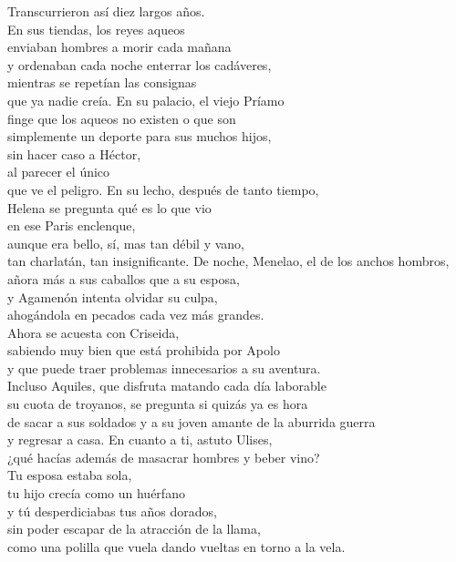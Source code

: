 \begin{versopropio}
Transcurrieron así diez largos años.\\
En sus tiendas, los reyes aqueos\\
enviaban hombres a morir cada mañana\\
y ordenaban cada noche enterrar los cadáveres,\\
mientras se repetían las consignas\\
que ya nadie creía.
\stanzabreak
En su palacio, el viejo Príamo\\
finge que los aqueos no existen o que son\\
simplemente un deporte para sus muchos hijos,\\
sin hacer caso a Héctor,\\
al parecer el único\\
que ve el peligro.
\stanzabreak
En su lecho, después de tanto tiempo,\\
Helena se pregunta qué es lo que vio\\
en ese Paris enclenque,\\
aunque era bello, sí, mas tan débil y vano,\\
tan charlatán, tan insignificante.
\stanzabreak
De noche, Menelao, el de los anchos hombros,\\
añora más a sus caballos que a su esposa,\\
y Agamenón intenta olvidar su culpa,\\
ahogándola en pecados cada vez más grandes.\\
Ahora se acuesta con Criseida,\\
sabiendo muy bien que está prohibida por Apolo\\
y que puede traer problemas innecesarios a su aventura.\\
Incluso Aquiles, que disfruta matando cada día laborable\\
su cuota de troyanos, se pregunta si quizás ya es hora\\
de sacar a sus soldados y a su joven amante de la aburrida guerra\\
y regresar a casa.
\stanzabreak
En cuanto a ti, astuto Ulises,\\
¿qué hacías además de masacrar hombres y beber vino?\\
Tu esposa estaba sola,\\
tu hijo crecía como un huérfano\\
y tú desperdiciabas tus años dorados,\\
sin poder escapar de la atracción de la llama,\\
como una polilla que vuela dando vueltas en torno a la vela.
\end{versopropio}

